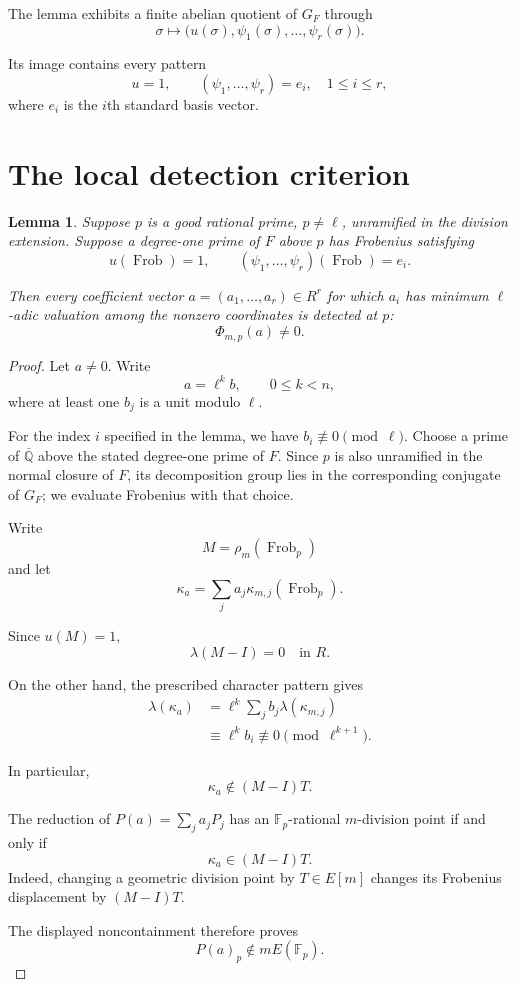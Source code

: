 \documentclass[11pt]{article}
\newtheorem{lemma}[theorem]{Lemma}
\begin{document}
The lemma exhibits a finite abelian
quotient of $G_F$ through
\[
\sigma\longmapsto
\bigl(u(\sigma),\psi_1(\sigma),
\ldots,\psi_r(\sigma)\bigr).
\]

Its image contains every pattern
\[
\boxed{
u=1,\qquad
(\psi_1,\ldots,\psi_r)=e_i,
\quad 1\le i\le r,
}
\]
where $e_i$ is the $i$th standard
basis vector.

\section{The local detection criterion}

\begin{lemma}
\label{lem:detection}
Suppose $p$ is a good rational prime,
$p\ne\ell$, unramified in the division
extension. Suppose a degree-one prime
of $F$ above $p$ has Frobenius satisfying
\[
u(\operatorname{Frob})=1,
\qquad
(\psi_1,\ldots,\psi_r)
(\operatorname{Frob})=e_i.
\]

Then every coefficient vector
$a=(a_1,\ldots,a_r)\in R^r$ for which
$a_i$ has minimum $\ell$-adic valuation
among the nonzero coordinates is detected
at $p$:
\[
\Phi_{m,p}(a)\ne0.
\]
\end{lemma}

\begin{proof}
Let $a\ne0$. Write
\[
a=\ell^k b,\qquad 0\le k<n,
\]
where at least one $b_j$ is a unit
modulo $\ell$.

For the index $i$ specified in the lemma, we have $b_i\not\equiv0\pmod\ell$. Choose a prime of $\overline{\mathbb Q}$ above the stated degree-one prime of $F$. Since $p$ is also unramified in the normal closure of $F$, its decomposition group lies in the corresponding conjugate of $G_F$; we evaluate Frobenius with that choice.

Write
\[
M=\rho_m(\operatorname{Frob}_p)
\]
and let
\[
\kappa_a=\sum_j a_j\kappa_{m,j}
(\operatorname{Frob}_p).
\]

Since $u(M)=1$,
\[
\lambda(M-I)=0\quad\text{in }R.
\]

On the other hand, the prescribed
character pattern gives
\[
\begin{aligned}
\lambda(\kappa_a)
&=\ell^k
\sum_j b_j\lambda(\kappa_{m,j})\\
&\equiv\ell^k b_i
\not\equiv0\pmod{\ell^{k+1}}.
\end{aligned}
\]

In particular,
\[
\kappa_a\notin(M-I)T.
\]

The reduction of
$P(a)=\sum_j a_jP_j$ has an
$\mathbb F_p$-rational $m$-division
point if and only if
\[
\kappa_a\in(M-I)T.
\]
Indeed, changing a geometric division
point by $T\in E[m]$ changes its
Frobenius displacement by $(M-I)T$.

The displayed noncontainment therefore
proves
\[
P(a)_p\notin mE(\mathbb F_p).
\]
\end{proof}
\end{document}

